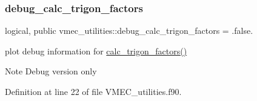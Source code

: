 \subsubsection{\texorpdfstring{debug\+\_\+calc\+\_\+trigon\+\_\+factors}{debug\_calc\_trigon\_factors}}
{\footnotesize\ttfamily logical, public vmec\+\_\+utilities\+::debug\+\_\+calc\+\_\+trigon\+\_\+factors = .false.}



plot debug information for \hyperlink{namespacevmec__utilities_ac699116fc25fdea3e28e488513d97c87}{calc\+\_\+trigon\+\_\+factors()} 

\begin{DoxyNote}{Note}
Debug version only 
\end{DoxyNote}


Definition at line 22 of file V\+M\+E\+C\+\_\+utilities.\+f90.

